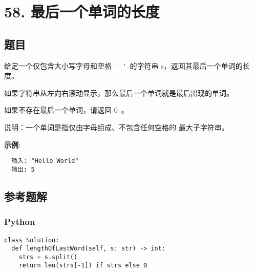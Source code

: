 \newpage
\section{58. 最后一个单词的长度}
\label{leetcode:58}

\subsection{题目}

给定一个仅包含大小写字母和空格 \verb|' '| 的字符串 s，返回其最后一个单词的长度。

如果字符串从左向右滚动显示，那么最后一个单词就是最后出现的单词。

如果不存在最后一个单词，请返回 0 。

说明：一个单词是指仅由字母组成、不包含任何空格的 最大子字符串。

\textbf{示例}:

\begin{verbatim}
  输入: "Hello World"
  输出: 5
\end{verbatim}

\subsection{参考题解}

\subsubsection{Python}

\begin{verbatim}
class Solution:
  def lengthOfLastWord(self, s: str) -> int:
    strs = s.split()
    return len(strs[-1]) if strs else 0
\end{verbatim}
